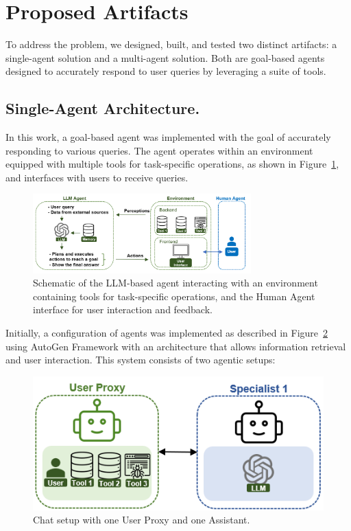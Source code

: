     \section{Proposed Artifacts}

            To address the problem, we designed, built, and tested two distinct artifacts: a single-agent solution and a multi-agent solution. Both are goal-based agents designed to accurately respond to user queries by leveraging a suite of tools.

        \subsection{Single-Agent Architecture.}

            In this work, a goal-based agent \citep{Russell2020} was implemented with the goal of accurately responding to various queries. 
            The agent operates within an environment equipped with multiple tools for task-specific operations, as shown in Figure~\ref{fig:agent_environment}, and interfaces with users to receive queries.
            
            \begin{figure}[h]
                \centering
                \includegraphics[width=0.75\textwidth]{images/agent_environment_4.png}
                \caption{Schematic of the LLM-based agent interacting with an environment containing tools for task-specific operations, and the Human Agent interface for user interaction and feedback.}
                \label{fig:agent_environment}
            \end{figure}           
            
            Initially, a configuration of agents was implemented as described in Figure~\ref{fig:agent_config_1} using AutoGen Framework \citep{Wu2023} with an architecture that allows information retrieval and user interaction. This system consists of two agentic setups:

            \begin{figure}[h]
                \centering
                \includegraphics[width=.5\textwidth]{images/agent_config_1.png}
                \caption{Chat setup with one User Proxy \citep{Wu2023} and one Assistant.}
                \label{fig:agent_config_1}
            \end{figure}

